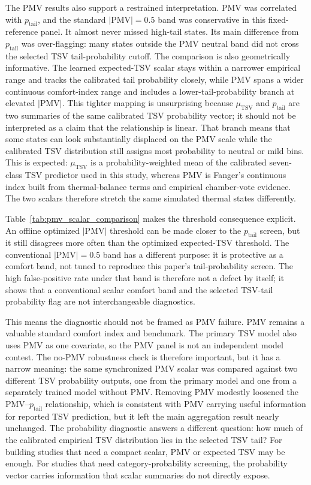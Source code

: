 The PMV results also support a restrained interpretation. PMV was correlated with $p_{\mathrm{tail}}$, and the standard $|\mathrm{PMV}|=0.5$ band was conservative in this fixed-reference panel. It almost never missed high-tail states. Its main difference from $p_{\mathrm{tail}}$ was over-flagging: many states outside the PMV neutral band did not cross the selected TSV tail-probability cutoff. The comparison is also geometrically informative. The learned expected-TSV scalar stays within a narrower empirical range and tracks the calibrated tail probability closely, while PMV spans a wider continuous comfort-index range and includes a lower-tail-probability branch at elevated $|\mathrm{PMV}|$. This tighter mapping is unsurprising because $\mu_{\mathrm{TSV}}$ and $p_{\mathrm{tail}}$ are two summaries of the same calibrated TSV probability vector; it should not be interpreted as a claim that the relationship is linear. That branch means that some states can look substantially displaced on the PMV scale while the calibrated TSV distribution still assigns most probability to neutral or mild bins. This is expected: $\mu_{\mathrm{TSV}}$ is a probability-weighted mean of the calibrated seven-class TSV predictor used in this study, whereas PMV is Fanger's continuous index built from thermal-balance terms and empirical chamber-vote evidence. The two scalars therefore stretch the same simulated thermal states differently.

Table~\ref{tab:pmv_scalar_comparison} makes the threshold consequence explicit. An offline optimized $|\mathrm{PMV}|$ threshold can be made closer to the $p_{\mathrm{tail}}$ screen, but it still disagrees more often than the optimized expected-TSV threshold. The conventional $|\mathrm{PMV}|=0.5$ band has a different purpose: it is protective as a comfort band, not tuned to reproduce this paper's tail-probability screen. The high false-positive rate under that band is therefore not a defect by itself; it shows that a conventional scalar comfort band and the selected TSV-tail probability flag are not interchangeable diagnostics.

This means the diagnostic should not be framed as PMV failure. PMV remains a valuable standard comfort index and benchmark. The primary TSV model also uses PMV as one covariate, so the PMV panel is not an independent model contest. The no-PMV robustness check is therefore important, but it has a narrow meaning: the same synchronized PMV scalar was compared against two different TSV probability outputs, one from the primary model and one from a separately trained model without PMV. Removing PMV modestly loosened the PMV--$p_{\mathrm{tail}}$ relationship, which is consistent with PMV carrying useful information for reported TSV prediction, but it left the main aggregation result nearly unchanged. The probability diagnostic answers a different question: how much of the calibrated empirical TSV distribution lies in the selected TSV tail? For building studies that need a compact scalar, PMV or expected TSV may be enough. For studies that need category-probability screening, the probability vector carries information that scalar summaries do not directly expose.

